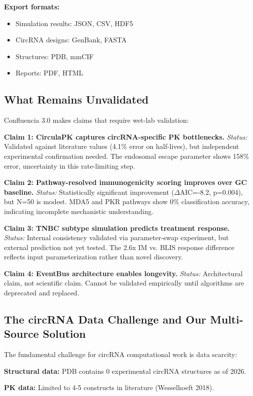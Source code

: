 \documentclass[12pt]{article}
\begin{document}
\textbf{Export formats:}
\begin{itemize}
\item Simulation results: JSON, CSV, HDF5
\item CircRNA designs: GenBank, FASTA
\item Structures: PDB, mmCIF
\item Reports: PDF, HTML
\end{itemize}

\subsection{What Remains Unvalidated}

Confluencia 3.0 makes claims that require wet-lab validation:

\textbf{Claim 1: CirculaPK captures circRNA-specific PK bottlenecks.}
\textit{Status:} Validated against literature values (4.1\% error on half-lives), but independent experimental confirmation needed. The endosomal escape parameter shows 158\% error, uncertainty in this rate-limiting step.

\textbf{Claim 2: Pathway-resolved immunogenicity scoring improves over GC baseline.}
\textit{Status:} Statistically significant improvement ($\Delta$AIC=-8.2, p=0.004), but N=50 is modest. MDA5 and PKR pathways show 0\% classification accuracy, indicating incomplete mechanistic understanding.

\textbf{Claim 3: TNBC subtype simulation predicts treatment response.}
\textit{Status:} Internal consistency validated via parameter-swap experiment, but external prediction not yet tested. The 2.6x IM vs. BLIS response difference reflects input parameterization rather than novel discovery.

\textbf{Claim 4: EventBus architecture enables longevity.}
\textit{Status:} Architectural claim, not scientific claim. Cannot be validated empirically until algorithms are deprecated and replaced.

\subsection{The circRNA Data Challenge and Our Multi-Source Solution}

The fundamental challenge for circRNA computational work is data scarcity:

\textbf{Structural data:} PDB contains 0 experimental circRNA structures as of 2026.

\textbf{PK data:} Limited to 4-5 constructs in literature (Wesselhoeft 2018).
\end{document}

